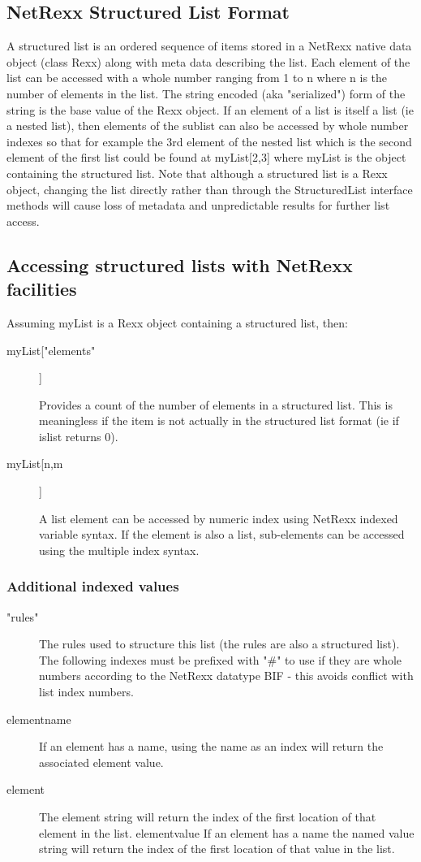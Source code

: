 \subsection{NetRexx Structured List Format}
A structured list is an ordered sequence of items stored in a NetRexx
native data object (class Rexx) along with meta data describing the
list. Each element of the list can be accessed with a whole number
ranging from 1 to n where n is the number of elements in the list. The
string encoded (aka "serialized") form of the string is the base value
of the Rexx object. If an element of a list is itself a list (ie a
nested list), then elements of the sublist can also be accessed by
whole number indexes so that for example the 3rd element of the nested
list which is the second element of the first list could be found at
myList[2,3] where myList is the object containing the structured
list. Note that although a structured list is a Rexx object, changing
the list directly rather than through the StructuredList interface
methods will cause loss of metadata and unpredictable results for
further list access.

\subsection{Accessing structured lists with NetRexx facilities}
Assuming myList is a Rexx object containing a structured list, then:
\begin{description}


\item[myList["elements"]]

Provides a count of the number of elements in a structured list. This is meaningless if the item is not actually in the structured list format (ie if islist returns 0). 

\item[myList[n,m]]

A list element can be accessed by numeric index using NetRexx indexed variable syntax. If the element is also a list, sub-elements can be accessed using the multiple index syntax.
\end{description}

\subsubsection{Additional indexed values}
\begin{description}
\item["rules"]
The rules used to structure this list (the rules are also a structured list).
The following indexes must be prefixed with "\#" to use if they are whole numbers according to the NetRexx datatype BIF - this avoids conflict with list index numbers.
\item[elementname]
If an element has a name, using the name as an index will return the associated element value.

\item[element]
The element string will return the index of the first location of that element in the list.
elementvalue
If an element has a name the named value string will return the index of the first location of that value in the list.
\end{description}

